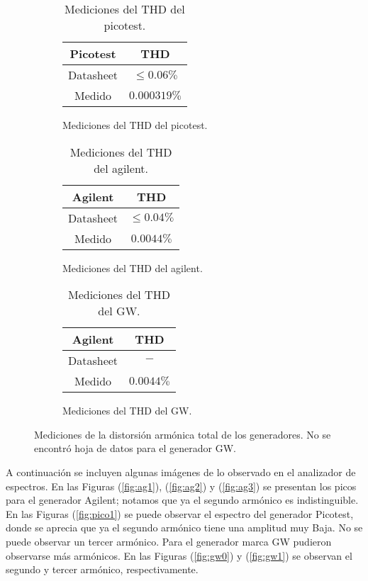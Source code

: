 \begin{figure}[H]
\begin{subfigure}{0.33\textwidth}
\begin{table}[H]
\centering
\begin{tabular}{@{}cc@{}}
\toprule
Picotest & THD\\ \midrule
Datasheet & $\leq 0.06\%$  \\
Medido & $0.000319\%$ \\ \bottomrule
\end{tabular}
\caption{Mediciones del THD del picotest.}
\end{table}
\end{subfigure}
\begin{subfigure}{0.33\textwidth}
\begin{table}[H]
\centering
\begin{tabular}{@{}cc@{}}
\toprule
Agilent & THD \\ \midrule
Datasheet & $\leq 0.04\%$ \\
Medido & $0.0044\%$ \\ \bottomrule
\end{tabular}
\caption{Mediciones del THD del agilent.}
\end{table}
\end{subfigure}
\begin{subfigure}{0.33\textwidth}
\begin{table}[H]
\centering
\begin{tabular}{@{}cc@{}}
\toprule
Agilent & THD \\ \midrule
Datasheet & $-$ \\
Medido & $0.0044\%$ \\ \bottomrule
\end{tabular}
\caption{Mediciones del THD del GW.}
\end{table}
\end{subfigure}
\caption{Mediciones de la distorsión armónica total de los generadores. No se encontró hoja de datos para el generador GW.}
\end{figure}

A continuación se incluyen algunas imágenes de lo observado en el analizador de espectros. En las Figuras (\ref{fig:ag1}), (\ref{fig:ag2}) y (\ref{fig:ag3}) se presentan los picos para el generador Agilent; notamos que ya el segundo armónico es indistinguible. En las Figuras (\ref{fig:pico1}) se puede observar el espectro del generador Picotest, donde se aprecia que ya el segundo armónico tiene una amplitud muy Baja. No se puede observar un tercer armónico. Para el generador marca GW pudieron observarse más armónicos. En las Figuras (\ref{fig:gw0}) y (\ref{fig:gw1}) se observan el segundo y tercer armónico, respectivamente.

